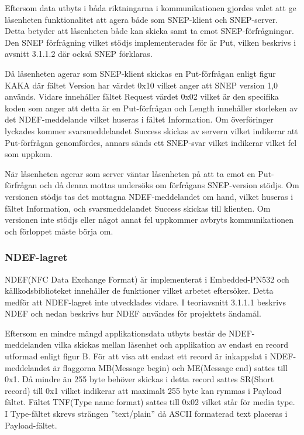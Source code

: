 \documentclass[11pt]{article}
\begin{document}
Eftersom data utbyts i båda riktningarna i kommunikationen gjordes valet att ge låsenheten funktionalitet att agera både som SNEP-klient och SNEP-server. Detta betyder att låsenheten både kan skicka samt ta emot SNEP-förfrågningar. Den SNEP förfrågning vilket stödjs implementerades för är Put, vilken beskrivs i avsnitt 3.1.1.2 där också SNEP förklaras. 

Då låsenheten agerar som SNEP-klient skickas en Put-förfrågan enligt figur KAKA där fältet Version har värdet 0x10 vilket anger att SNEP version 1,0 används. Vidare innehåller fältet Request värdet 0x02 vilket är den specifika koden som anger att detta är en Put-förfrågan och Length innehåller storleken av det NDEF-meddelande vilket huseras i fältet Information. Om överföringer lyckades kommer svarsmeddelandet Success skickas av servern vilket indikerar att Put-förfrågan genomfördes, annars sänds ett SNEP-svar vilket indikerar vilket fel som uppkom. 


När låsenheten agerar som server väntar låsenheten på att ta emot en Put-förfrågan och då denna mottas undersöks om förfrågans SNEP-version stödjs. Om versionen stödjs tas det mottagna NDEF-meddelandet om hand, vilket huseras i fältet Information, och svarsmeddelandet Success skickas till klienten. Om versionen inte stödjs eller något annat fel uppkommer avbryts kommunikationen och förloppet måste börja om.

\subsubsection{NDEF-lagret}
NDEF(NFC Data Exchange Format) är implementerat i Embedded-PN532 och källkodsbiblioteket innehåller de funktioner vilket arbetet eftersöker. Detta medför att NDEF-lagret inte utvecklades vidare. I teoriavsnitt 3.1.1.1 beskrivs NDEF och nedan beskrivs hur NDEF användes för projektets ändamål. 

Eftersom en mindre mängd applikationsdata utbyts består de NDEF-meddelanden vilka skickas mellan låsenhet och applikation av endast en record utformad enligt figur B. För att visa att endast ett record är inkappslat i NDEF-meddelandet är flaggorna MB(Message begin) och ME(Message end) sattes till 0x1. Då mindre än 255 byte behöver skickas i detta record sattes SR(Short record) till 0x1 vilket indikerar att maximalt 255 byte kan rymmas i Payload fältet. Fältet TNF(Type name format) sattes till 0x02 vilket står för media type. I Type-fältet skrevs strängen ”text/plain” då ASCII formaterad text placeras i Payload-fältet. 
\end{document}
